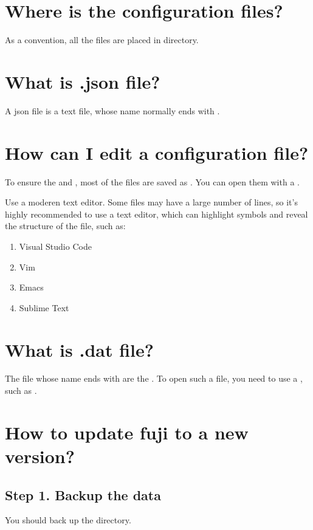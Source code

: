 \section{Where is the configuration files?}
As a convention, all the files are placed in  directory.


\section{What is .json file?}
A json file is a text file, whose name normally ends with .


\section{How can I edit a configuration file?}
To ensure the  and , most of the files are saved as .
You can open them with a .

\begin{tips}{Use a moderen text editor.}
    Some files may have a large number of lines, so it's highly recommended to use a  text editor, which can highlight symbols and reveal the structure of the file, such as:
    \begin{enumerate}
        \item Visual Studio Code
        \item Vim
        \item Emacs
        \item Sublime Text
    \end{enumerate}
\end{tips}


\section{What is .dat file?}
The file whose name ends with  are the .
To open such a file, you need to use a , such as .


\section{How to update fuji to a new version?}

\subsection{Step 1. Backup the data}
You should back up the  directory.

